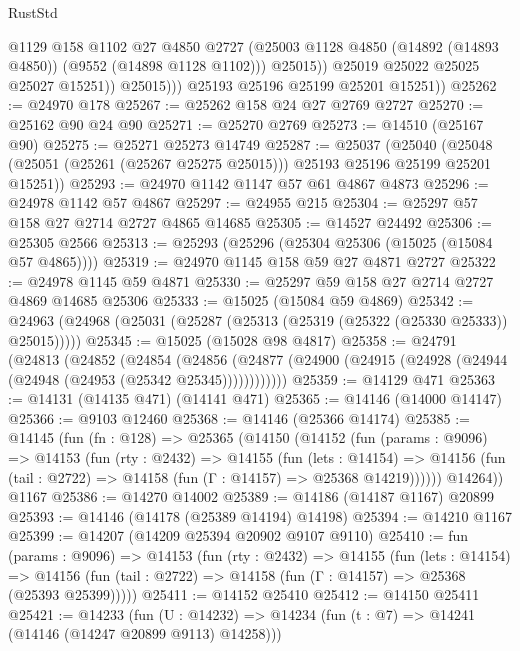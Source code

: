 \begin{lexlean}{RustStd}
\begin{coremodule}
                      @1129
                      @158
                      @1102
                      @27
                      @4850
                      @2727
                      (@25003 @1128 @4850 (@14892 (@14893 @4850)) (@9552 (@14898 @1128 @1102)))
                      @25015))
                  @25019
                  @25022
                  @25025
                  @25027
                  @15251))
              @25015)))
        @25193
        @25196
        @25199
        @25201
        @15251))
@25262 := @24970 @178
@25267 := @25262 @158 @24 @27 @2769 @2727
@25270 := @25162 @90 @24 @90
@25271 := @25270 @2769
@25273 := @14510 (@25167 @90)
@25275 := @25271 @25273 @14749
@25287 := @25037
    (@25040 (@25048 (@25051 (@25261 (@25267 @25275 @25015))) @25193 @25196 @25199 @25201 @15251))
@25293 := @24970 @1142 @1147 @57 @61 @4867 @4873
@25296 := @24978 @1142 @57 @4867
@25297 := @24955 @215
@25304 := @25297 @57 @158 @27 @2714 @2727 @4865 @14685
@25305 := @14527 @24492
@25306 := @25305 @2566
@25313 := @25293 (@25296 (@25304 @25306 (@15025 (@15084 @57 @4865))))
@25319 := @24970 @1145 @158 @59 @27 @4871 @2727
@25322 := @24978 @1145 @59 @4871
@25330 := @25297 @59 @158 @27 @2714 @2727 @4869 @14685 @25306
@25333 := @15025 (@15084 @59 @4869)
@25342 := @24963 (@24968 (@25031 (@25287 (@25313 (@25319 (@25322 (@25330 @25333)) @25015)))))
@25345 := @15025 (@15028 @98 @4817)
@25358 := @24791
    (@24813
      (@24852
        (@24854
          (@24856 (@24877 (@24900 (@24915 (@24928 (@24944 (@24948 (@24953 (@25342 @25345))))))))))))
@25359 := @14129 @471
@25363 := @14131 (@14135 @471) (@14141 @471)
@25365 := @14146 (@14000 @14147)
@25366 := @9103 @12460
@25368 := @14146 (@25366 @14174)
@25385 := @14145
    (fun (fn : @128) =>
    @25365
      (@14150
        (@14152
          (fun (params : @9096) =>
          @14153
            (fun (rty : @2432) =>
            @14155
              (fun (lets : @14154) =>
              @14156 (fun (tail : @2722) => @14158 (fun (Γ : @14157) => @25368 @14219))))))
        @14264))
    @1167
@25386 := @14270 @14002
@25389 := @14186 (@14187 @1167) @20899
@25393 := @14146 (@14178 (@25389 @14194) @14198)
@25394 := @14210 @1167
@25399 := @14207 (@14209 @25394 @20902 @9107 @9110)
@25410 := fun (params : @9096) =>
  @14153
    (fun (rty : @2432) =>
    @14155
      (fun (lets : @14154) =>
      @14156 (fun (tail : @2722) => @14158 (fun (Γ : @14157) => @25368 (@25393 @25399)))))
@25411 := @14152 @25410
@25412 := @14150 @25411
@25421 := @14233
    (fun (U : @14232) => @14234 (fun (t : @7) => @14241 (@14146 (@14247 @20899 @9113) @14258)))

\end{coremodule}
\end{lexlean}
